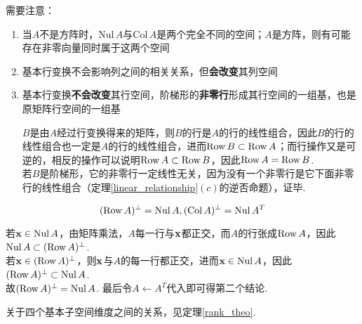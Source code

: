 需要注意：
\begin{enumerate}
	\itemsep -3pt
	\item 当$A$不是方阵时，$\mathrm{Nul}\, A$与$\mathrm{Col}\, A$是两个完全不同的空间；$A$是方阵，则有可能存在非零向量同时属于这两个空间
	\item 基本行变换不会影响列之间的相关关系，但\textbf{会改变}其列空间
	\item 基本行变换\textbf{不会改变}其行空间，阶梯形的\textbf{非零行}形成其行空间的一组基，也是原矩阵行空间的一组基
\begin{analysis}
$B$是由$A$经过行变换得来的矩阵，则$B$的行是$A$的行的线性组合，因此$B$的行的线性组合也一定是$A$的行的线性组合，进而$\mathrm{Row}\, B\subset\mathrm{Row}\, A$；而行操作又是可逆的，相反的操作可以说明$\mathrm{Row}\, A\subset\mathrm{Row}\, B$，因此$\mathrm{Row}\, A=\mathrm{Row}\, B$.\\
若$B$是阶梯形，它的非零行一定线性无关，因为没有一个非零行是它下面非零行的线性组合（定理\ref{linear_relationship}$(c)$的逆否命题），证毕.
\end{analysis}
\end{enumerate}
\begin{theorem}
\[(\mathrm{Row}\, A)^{\perp}=\mathrm{Nul}\, A,(\mathrm{Col}\, A)^{\perp}=\mathrm{Nul}\, A^T\]
\end{theorem}
\begin{analysis}
若$\mathbf{x}\in\mathrm{Nul}\, A$，由矩阵乘法，$A$每一行与$\mathbf{x}$都正交，而$A$的行张成$\mathrm{Row}\, A$，因此$\mathrm{Nul}\, A\subset(\mathrm{Row}\, A)^{\perp}$.\\
若$\mathbf{x}\in(\mathrm{Row}\, A)^\perp$，则$\mathbf{x}$与$A$的每一行都正交，进而$\mathbf{x}\in\mathrm{Nul}\, A$，因此$(\mathrm{Row}\, A)^{\perp}\subset\mathrm{Nul}\, A$.\\
故$(\mathrm{Row}\, A)^{\perp}=\mathrm{Nul}\, A$. 最后令$A\gets A^T$代入即可得第二个结论.
\end{analysis}
\par 关于四个基本子空间维度之间的关系，见定理\ref{rank_theo}.

